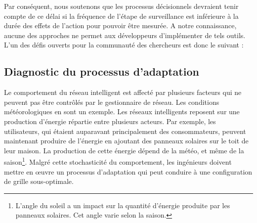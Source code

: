 Par conséquent, nous soutenons que les processus décisionnels devraient tenir compte de ce délai si la fréquence de l'étape de surveillance est inférieure à la durée des effets de l'action pour pouvoir être mesurée. 
A notre connaissance, aucune des approches ne permet aux développeurs d'implémenter de tels outils. 
L'un des défis ouverts pour la communauté des chercheurs est donc le suivant :
\vspace{-2em}

\subsection{Diagnostic du processus d'adaptation}
\label{sec_french_challenges_diagnosis}

%
Le comportement du réseau intelligent est affecté par plusieurs facteurs qui ne peuvent pas être contrôlés par le gestionnaire de réseau. 
Les conditions météorologiques en sont un exemple. Les réseaux intelligents reposent sur une production d'énergie répartie entre plusieurs acteurs. 
Par exemple, les utilisateurs, qui étaient auparavant principalement des consommateurs, peuvent maintenant produire de l'énergie en ajoutant des panneaux solaires sur le toit de leur maison. 
La production de cette énergie dépend de la météo, et même de la saison\footnote{L'angle du soleil a un impact sur la quantité d'énergie produite par les panneaux solaires. Cet angle varie selon la saison.}. 
Malgré cette stochasticité du comportement, les ingénieurs doivent mettre en œuvre un processus d'adaptation qui peut conduire à une configuration de grille sous-optimale.

